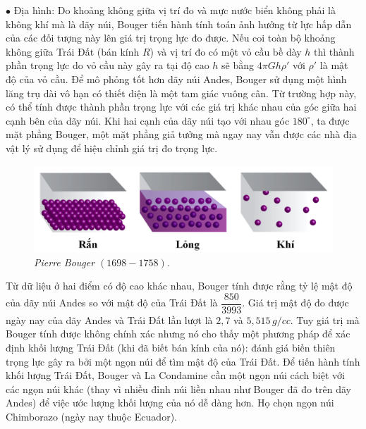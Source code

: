 \begin{multicols}{2}
	\vskip 0.1cm
	$\bullet$ Địa hình: Do khoảng không giữa vị trí đo và mực nước biển không phải là không khí mà là dãy núi, Bouger tiến hành tính toán ảnh hưởng từ lực hấp dẫn của các đối tượng này lên giá trị trọng lực đo được. Nếu coi toàn bộ khoảng không giữa Trái Đất (bán kính $R$) và vị trí đo có một vỏ cầu bề dày $h$ thì thành phần trọng lực do vỏ cầu này gây ra tại độ cao $h$ sẽ bằng $4\pi Gh\rho'$ với $\rho'$ là mật độ của vỏ cầu. Để mô phỏng tốt hơn dãy núi Andes, Bouger sử dụng một hình lăng trụ dài vô hạn có thiết diện là một tam giác vuông cân. Từ trường hợp này, có thể tính được thành phần trọng lực với các giá trị khác nhau của góc giữa hai cạnh bên của dãy núi. Khi hai cạnh của dãy núi tạo với nhau góc $180^\circ$, ta được mặt phẳng Bouger, một mặt phẳng giả tưởng mà ngay nay vẫn được các nhà địa vật lý sử dụng để hiệu chỉnh giá trị đo trọng lực.
	\begin{figure}[H]
		\vspace*{-5pt}
		\centering
		\captionsetup{labelformat= empty, justification=centering}
		\includegraphics[width =0.75\linewidth]{7}
		\caption{\small\textit{\color{timhieukhoahoc}Pierre Bouger $(1698 - 1758)$.}}
		\vspace*{-10pt}
	\end{figure}
	Từ dữ liệu ở hai điểm có độ cao khác nhau, Bouger tính được rằng tỷ lệ mật độ của dãy núi Andes so với mật độ của Trái Đất là $\dfrac{850}{3993}$. Giá trị mật độ đo được ngày nay của dãy Andes và Trái Đất lần lượt là $2{,}7$ và $5{,}515\, g/cc$. Tuy giá trị mà Bouger tính được không chính xác nhưng nó cho thấy một phương pháp để xác định khối lượng Trái Đất (khi đã biết bán kính của nó): đánh giá biến thiên trọng lực gây ra bởi một ngọn núi để tìm mật độ của Trái Đất.
	\vskip 0.1cm
	Để tiến hành tính khối lượng Trái Đất, Bouger và La Condamine cần một ngọn núi cách biệt với các ngọn núi khác (thay vì nhiều đỉnh núi liền nhau như Bouger đã đo trên dãy Andes) để việc ước lượng khối lượng của nó dễ dàng hơn. Họ chọn ngọn núi Chimborazo (ngày nay thuộc Ecuador).
	\begin{figure}[H]
		\vspace*{5pt}
		\centering
		\captionsetup{labelformat= empty, justification=centering}

\end{figure}
\end{multicols}
